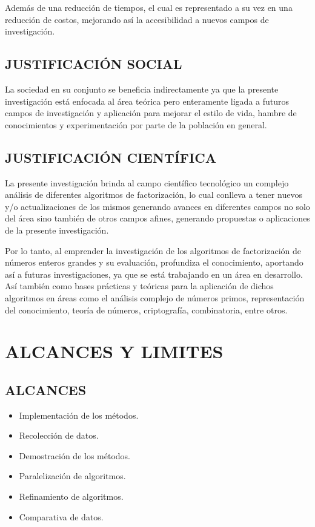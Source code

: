 \documentclass[12pt,letterpaper]{book}
\begin{document}
    Además de una reducción de tiempos, el cual es representado a su vez en una reducción de costos, mejorando así la accesibilidad a nuevos campos de investigación.
    
    \section{JUSTIFICACIÓN SOCIAL}
    La sociedad en su conjunto se beneficia indirectamente ya que la presente investigación está enfocada al área teórica pero enteramente ligada a futuros campos de investigación y aplicación para mejorar el estilo de vida, hambre de conocimientos y experimentación por parte de la población en general.

    \section{JUSTIFICACIÓN CIENTÍFICA}
    La presente investigación brinda al campo científico tecnológico un complejo análisis de diferentes algoritmos de factorización, lo cual conlleva a tener nuevos y/o actualizaciones de los mismos generando avances en diferentes campos no solo del área sino también de otros campos afines, generando propuestas o aplicaciones de la presente investigación.

    Por lo tanto, al emprender la investigación de los algoritmos de factorización de números enteros grandes y su evaluación, profundiza el conocimiento, aportando así a futuras investigaciones, ya que se está trabajando en un área en desarrollo. Así también como bases prácticas y teóricas para la aplicación de dichos algoritmos en áreas como el análisis complejo de números primos, representación del conocimiento, teoría de números, criptografía, combinatoria, entre otros.
    
    \chapter{ALCANCES Y LIMITES}
    \section{ALCANCES}
    \begin{itemize}
        \item{Implementación de los métodos.}
        \item{Recolección de datos.}
        \item{Demostración de los métodos.}
        \item{Paralelización de algoritmos.}
        \item{Refinamiento de algoritmos.}
        \item{Comparativa de datos.}
    \end{itemize}
    
\end{document}

